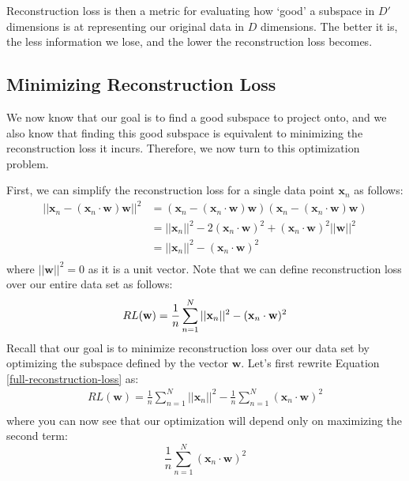 Reconstruction loss is then a metric for evaluating how `good' a subspace in $D'$ dimensions is at representing our original data in $D$ dimensions. The better it is, the less information we lose, and the lower the reconstruction loss becomes.

\subsection{Minimizing Reconstruction Loss}
We now know that our goal is to find a good subspace to project onto, and we also know that finding this good subspace is equivalent to minimizing the reconstruction loss it incurs. Therefore, we now turn to this optimization problem.

First, we can simplify the reconstruction loss for a single data point $\textbf{x}_n$ as follows:
\begin{align*}
	||\textbf{x}_{n} - (\textbf{x}_{n} \cdot \textbf{w})\textbf{w}||^{2} &= (\textbf{x}_{n} - (\textbf{x}_{n} \cdot \textbf{w})\textbf{w})(\textbf{x}_{n} - (\textbf{x}_{n} \cdot \textbf{w})\textbf{w}) \\
	&= ||\textbf{x}_{n}||^{2} - 2(\textbf{x}_{n} \cdot \textbf{w})^{2} + (\textbf{x}_{n} \cdot \textbf{w})^{2}||\textbf{w}||^{2} \\
	&= ||\textbf{x}_{n}||^{2} - (\textbf{x}_{n} \cdot \textbf{w})^{2} \\
\end{align*}
where $||\textbf{w}||^{2} = 0$ as it is a unit vector. Note that we can define reconstruction loss over our entire data set as follows:
\begin{equation} \label{full-reconstruction-loss}
    RL(\textbf{w}) = \frac{1}{n} \sum_{n=1}^{N} ||\textbf{x}_{n}||^{2} - (\textbf{x}_{n} \cdot \textbf{w})^{2} \\
\end{equation}
Recall that our goal is to minimize reconstruction loss over our data set by optimizing the subspace defined by the vector $\textbf{w}$. Let's first rewrite Equation \ref{full-reconstruction-loss} as:
\begin{align*}
    RL(\textbf{w}) = \frac{1}{n} \sum_{n=1}^{N} ||\textbf{x}_{n}||^{2} - \frac{1}{n} \sum_{n=1}^{N} (\textbf{x}_{n} \cdot \textbf{w})^{2} \\
\end{align*}
where you can now see that our optimization will depend only on maximizing the second term:
\begin{equation} \label{max-for-recon-loss}
    \frac{1}{n} \sum_{n=1}^{N} (\textbf{x}_{n} \cdot \textbf{w})^{2}
\end{equation}
